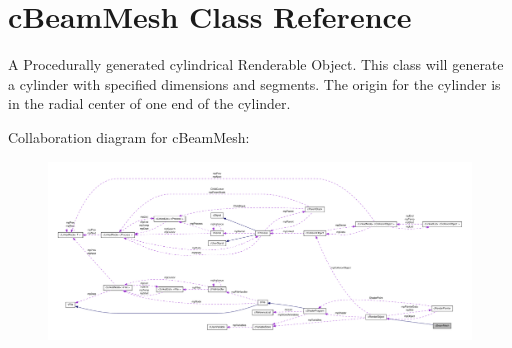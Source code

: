 \hypertarget{classc_beam_mesh}{
\section{cBeamMesh Class Reference}
\label{classc_beam_mesh}
}


A Procedurally generated cylindrical Renderable Object. This class will generate a cylinder with specified dimensions and segments. The origin for the cylinder is in the radial center of one end of the cylinder.  




Collaboration diagram for cBeamMesh:\nopagebreak
\begin{figure}[H]
\begin{center}
\leavevmode
\includegraphics[width=400pt]{classc_beam_mesh__coll__graph}
\end{center}
\end{figure}
